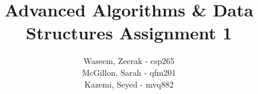 \title{Advanced Algorithms \& Data Structures Assignment 1}
\author{
  Waseem, Zeerak - csp265\\
  McGillon, Sarah - qfm201\\
  Kazemi, Seyed - mvq882
}
\maketitle
